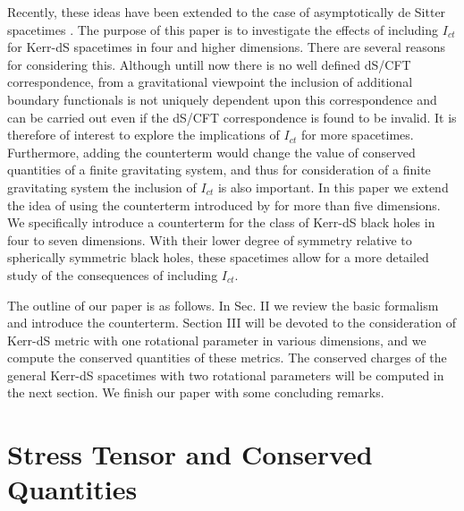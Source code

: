 \documentclass[a4paper,12pt,onecolumn]{revtex4}
\begin{document}
Recently, these ideas have been extended to the case of
asymptotically de Sitter spacetimes \cite{Kl1,Bal2}. The purpose
of this paper is to investigate the effects of including $I_{ct}$
for Kerr-dS spacetimes in four and higher dimensions. There are
several reasons for considering this. Although untill now there is
no well defined dS/CFT correspondence, from a gravitational
viewpoint the inclusion of additional boundary functionals is not
uniquely dependent upon this correspondence and can be carried out
even if the dS/CFT correspondence is found to be invalid. It is
therefore of interest to explore the implications of $I_{ct}$ for
more spacetimes. Furthermore, adding the counterterm would change
the value of conserved quantities of a finite gravitating system,
and thus for consideration of a finite gravitating system the
inclusion of $I_{ct}$ is also important. In this paper we extend
the idea of using the counterterm introduced by \cite {Kl1,Bal2}
for more than five dimensions. We specifically introduce a
counterterm for the class of Kerr-dS black holes in four to seven
dimensions. With their lower degree of symmetry relative to
spherically symmetric black holes, these spacetimes allow for a
more detailed study of the consequences of including $I_{ct}$.

The outline of our paper is as follows. In Sec. II we review the
basic formalism and introduce the counterterm. Section III will be
devoted to the consideration of Kerr-dS metric with one rotational
parameter in various dimensions, and we compute the conserved
quantities of these metrics. The conserved charges of the general
Kerr-dS spacetimes with two rotational parameters will be computed
in the next section. We finish our paper with some concluding
remarks.

\section{Stress Tensor and Conserved Quantities\label{StrTen}}
\end{document}
